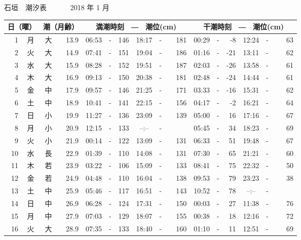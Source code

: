 \documentclass[12pt.a4j]{jsarticle}
\begin{document}
\pagestyle{empty}
 \begin{center}
 {\LARGE 石垣　潮汐表　　　}
 {\large 2018 年  1 月}\\
 \begin{table}[ht]
    \begin{tabular}{|rc|cr|ccrccr|ccrccr|}
    \hline
    \multicolumn{2}{|c|}{日（曜）} & \multicolumn{2}{c|}{潮（月齢）} & \multicolumn{6}{c|}{満潮時刻　―　潮位(cm)} & \multicolumn{6}{c|}{干潮時刻　―　潮位(cm)} \\
 \hline
 1 & 月 & 大 & 13.9 &  06:53 &-& 146  &  18:17 &-& 181  &   00:29 &-&  -8  &   12:24 &-&  63  \\
 2 & 火 & 大 & 14.9 &  07:41 &-& 151  &  19:04 &-& 186  &   01:16 &-& -21  &   13:11 &-&  62  \\
 3 & 水 & 大 & 15.9 &  08:28 &-& 152  &  19:51 &-& 187  &   02:03 &-& -26  &   13:58 &-&  61  \\
 4 & 木 & 大 & 16.9 &  09:13 &-& 150  &  20:38 &-& 181  &   02:48 &-& -24  &   14:44 &-&  61  \\
 5 & 金 & 中 & 17.9 &  09:57 &-& 146  &  21:25 &-& 171  &   03:33 &-& -16  &   15:31 &-&  62  \\
 6 & 土 & 中 & 18.9 &  10:41 &-& 141  &  22:15 &-& 156  &   04:17 &-&  -2  &   16:21 &-&  64  \\
 7 & 日 & 小 & 19.9 &  11:27 &-& 136  &  23:09 &-& 139  &   05:00 &-&  16  &   17:16 &-&  67  \\
 8 & 月 & 小 & 20.9 &  12:15 &-& 133  &  --:-- &-&~~~~~ &   05:45 &-&  34  &   18:23 &-&  69  \\
 9 & 火 & 小 & 21.9 &  00:14 &-& 122  &  13:09 &-& 131  &   06:33 &-&  51  &   19:48 &-&  67  \\
10 & 水 & 長 & 22.9 &  01:39 &-& 110  &  14:08 &-& 131  &   07:30 &-&  65  &   21:21 &-&  60  \\
11 & 木 & 若 & 23.9 &  03:22 &-& 106  &  15:09 &-& 133  &   08:41 &-&  75  &   22:32 &-&  50  \\
12 & 金 & 若 & 24.9 &  04:48 &-& 110  &  16:04 &-& 138  &   09:53 &-&  79  &   23:23 &-&  38  \\
13 & 土 & 中 & 25.9 &  05:46 &-& 117  &  16:51 &-& 143  &   10:52 &-&  78  &   --:-- &-&~~~~~ \\
14 & 日 & 中 & 26.9 &  06:28 &-& 124  &  17:31 &-& 150  &   00:03 &-&  27  &   11:38 &-&  76  \\
15 & 月 & 中 & 27.9 &  07:03 &-& 129  &  18:07 &-& 155  &   00:38 &-&  18  &   12:16 &-&  72  \\
16 & 火 & 大 & 28.9 &  07:35 &-& 133  &  18:40 &-& 160  &   01:10 &-&  11  &   12:51 &-&  69  \\

\end{tabular}
\end{table}
\end{center}
\end{document}
